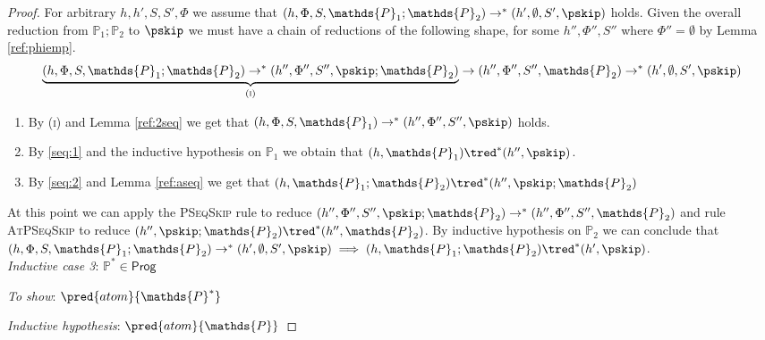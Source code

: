 {\begin{proof}
For arbitrary $h, h', S, S', \Phi$ we assume that $(h, \Phi, S, \mathds{P}_1 ; \mathds{P}_2) \rightarrow^* (h', \emptyset, S', \pskip)$ holds. Given the overall reduction from $\mathds{P}_1 ; \mathds{P}_2$ to $\pskip$ we must have a chain of reductions of the following shape, for some $h'', \Phi'', S''$ where $\Phi'' = \emptyset$ by Lemma \ref{ref:phiemp}.
\[
\underbrace{(h, \Phi, S, \mathds{P}_1 ; \mathds{P}_2) \rightarrow^* (h'', \Phi'', S'', \pskip; \mathds{P}_2)}_{(\textsc{i})}
\rightarrow (h'', \Phi'', S'', \mathds{P}_2) \rightarrow^* (h', \emptyset, S', \pskip)
\]
\begin{enumerate}
\item \label{seq:1} By (\textsc{i}) and Lemma \ref{ref:2seq} we get that $(h, \Phi, S, \mathds{P}_1) \rightarrow^* (h'', \Phi'', S'', \pskip)$ holds.
\item \label{seq:2} By \ref{seq:1} and the inductive hypothesis on $\mathds{P}_1$ we obtain that $(h, \mathds{P}_1) \tred^* (h'', \pskip)$.
\item By \ref{seq:2} and Lemma \ref{ref:aseq} we get that $(h, \mathds{P}_1 ; \mathds{P}_2) \tred^* (h'', \pskip ; \mathds{P}_2)$
\end{enumerate}

At this point we can apply the \textsc{PSeqSkip} rule to reduce $(h'', \Phi'', S'', \pskip ; \mathds{P}_2) \rightarrow^* (h'', \Phi'', S'', \mathds{P}_2)$ and rule \textsc{AtPSeqSkip} to reduce $(h'', \pskip ; \mathds{P}_2) \tred^* (h'', \mathds{P}_2)$. By inductive hypothesis on $\mathds{P}_2$ we can conclude that $(h, \Phi, S, \mathds{P}_1 ; \mathds{P}_2) \rightarrow^* (h', \emptyset, S', \pskip) \implies (h, \mathds{P}_1 ; \mathds{P}_2) \tred^* (h', \pskip)$. \\

\textit{Inductive case 3}: $\mathds{P}^* \in \mathsf{Prog}$

\textit{To show}: $\pred{atom}{\mathds{P}^*}$

\textit{Inductive hypothesis}: $\pred{atom}{\mathds{P}}$


\end{proof}}
